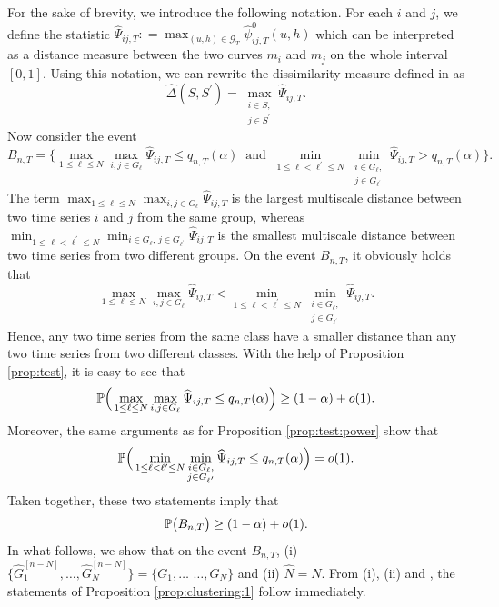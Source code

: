 \documentclass[12pt]{article}
\makeatletter
\renewcommand{\eqref}[1]{\tagform@{\ref{#1}}}
\makeatother
\begin{document}
For the sake of brevity, we introduce the following notation. For each $i$ and $j$, we define the statistic $\widehat{\Psi}_{ij,T} : = \max_{(u, h) \in \mathcal{G}_T}\hat{\psi}^0_{ij, T}(u, h)$ which can be interpreted as a distance measure between the two curves $m_i$ and $m_j$ on the whole interval $[0, 1]$. Using this notation, we can rewrite the dissimilarity measure defined in \eqref{dissimilarity} as 
\begin{equation*}
\widehat{\Delta}(S,S^\prime) = \max_{\substack{i \in S, \\ j \in S^\prime}} \widehat{\Psi}_{ij,T}. 
\end{equation*}
Now consider the event  
\[ B_{n,T} = \Big\{ \max_{1 \le \ell \le N} \max_{i,j \in G_\ell} \widehat{\Psi}_{ij,T} \le q_{n,T}(\alpha) \ \text{ and } \ \min_{1 \le \ell < \ell^\prime \le N} \min_{\substack{i \in G_\ell, \\ j \in G_{\ell^\prime}}} \widehat{\Psi}_{ij,T} > q_{n,T}(\alpha) \Big\}. \]
The term $\max_{1 \le \ell \le N} \max_{i,j \in G_\ell} \widehat{\Psi}_{ij,T}$ is the largest multiscale distance between two time series $i$ and $j$ from the same group, whereas $\min_{1 \le \ell < \ell^\prime \le N} \min_{i \in G_\ell, \, j \in G_{\ell^\prime}} \widehat{\Psi}_{ij,T}$ is the smallest multiscale distance between two time series from two different groups. On the event $B_{n,T}$, it obviously holds that 
\begin{equation}\label{eq1-prop-clustering-1}
\max_{1 \le \ell \le N} \max_{i,j \in G_\ell} \widehat{\Psi}_{ij,T} < \min_{1 \le \ell < \ell^\prime \le N} \min_{\substack{i \in G_\ell, \\ j \in G_{\ell^\prime}}} \widehat{\Psi}_{ij,T}. 
\end{equation}
Hence, any two time series from the same class have a smaller distance than any two time series from two different classes. With the help of Proposition \ref{prop:test}, it is easy to see that
\[  \mathbb{P} \Big( \max_{1 \le \ell \le N} \max_{i,j \in G_\ell} \widehat{\Psi}_{ij,T} \le q_{n,T}(\alpha) \Big) \ge (1 - \alpha) + o(1). \]
Moreover, the same arguments as for Proposition \ref{prop:test:power} show that 
\[  \mathbb{P} \Big( \min_{1 \le \ell < \ell^\prime \le N} \min_{\substack{i \in G_\ell, \\ j \in G_{\ell^\prime}}} \widehat{\Psi}_{ij,T} \le q_{n,T}(\alpha) \Big) = o(1). \]
Taken together, these two statements imply that 
\begin{equation}\label{eq2-prop-clustering-1}
\mathbb{P} \big( B_{n,T} \big) \ge (1-\alpha) + o(1). 
\end{equation}
In what follows, we show that on the event $B_{n,T}$, (i) $\{ \widehat{G}_1^{[n-N]},\ldots,\widehat{G}_N^{[n-N]} \big\} = \big\{ G_1,\ldots$ $\ldots,G_N \}$ and (ii) $\widehat{N} = N$. From (i), (ii) and \eqref{eq2-prop-clustering-1}, the statements of Proposition \ref{prop:clustering:1} follow immediately. 
\end{document}
